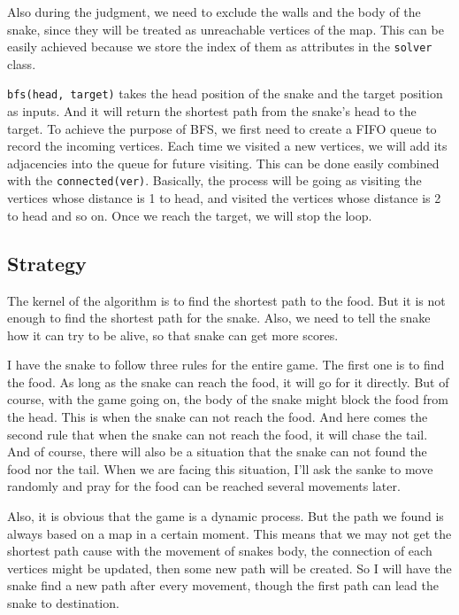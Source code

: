 \documentclass[12pt]{article}
\begin{document}
Also during the judgment, we need to exclude the walls and the body of the snake, since they 
will be treated as unreachable vertices of the map. This can be easily achieved because we 
store the index of them as attributes in the \verb|solver| class.

\verb|bfs(head, target)| takes the head position of the snake and the target position as 
inputs. And it will return the shortest path from the snake's head to the target. 
To achieve the purpose of BFS, we first need to create a FIFO queue to record the incoming 
vertices. Each time we visited a new vertices, we will add its adjacencies into the queue for 
future visiting. This can be done easily combined with the \verb|connected(ver)|. 
Basically, the process will be going as visiting the vertices whose distance is 1 to head, 
and visited the vertices whose distance is 2 to head and so on. Once we reach the target, 
we will stop the loop.

\subsection{Strategy}

The kernel of the algorithm is to find the shortest path to the food. But it is not enough to
find the shortest path for the snake. Also, we need to tell the snake how it can try to be 
alive, so that snake can get more scores. 

I have the snake to follow three rules for the entire game. The first one is to find the food. 
As long as the snake can reach the food, it will go for it directly. But of course, with the 
game going on, the body of the snake might block the food from the head. This is when the snake
can not reach the food. And here comes the second rule that when the snake can not reach the 
food, it will chase the tail. And of course, there will also be a situation that the snake can
not found the food nor the tail. When we are facing this situation, I'll ask the sanke to move 
randomly and pray for the food can be reached several movements later.

Also, it is obvious that the game is a dynamic process. But the path we found is always based on a map in a certain moment. This means that we may not get the shortest path cause with the movement of snakes body, the connection of each vertices might be updated, then some new path will be created. So I will have the snake find a new path after every movement, though the first path can lead the snake to destination.
\end{document}
